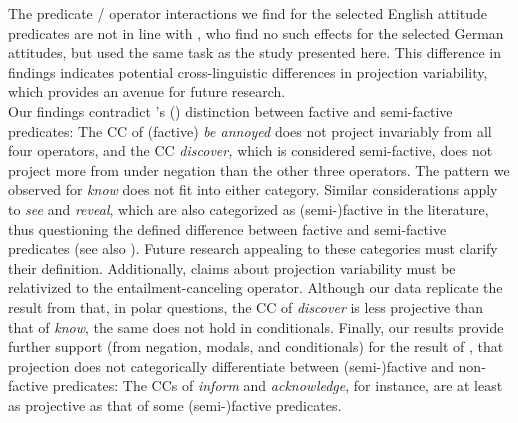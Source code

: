 \documentclass[12pt, a4paper]{article}
\newcommand{\posscite}[1]{\citeauthor{#1}'s (\citeyear{#1})}
\begin{document}
	The predicate / operator interactions we find for the selected English attitude predicates are not in line with \cite{sieker_projective_2022}, who find no such effects for the selected German attitudes, but used the same task as the study presented here. This difference in findings indicates potential cross-linguistic differences in projection variability, which provides an avenue for future research.\\

	Our findings contradict \posscite{karttunen_observations_1971} distinction between factive and semi-factive predicates: The CC of (factive) \emph{be annoyed} does not project invariably from all four operators, and the CC \emph{discover,}  which is considered semi-factive, does not project more from under negation than the other three operators. The pattern we observed for {\em know} does not fit into either category. Similar considerations apply to \emph{see} and \emph{reveal}, which are also categorized as (semi-)factive in the literature, thus questioning the defined difference between factive and semi-factive predicates (see also \citealp{beaver_have_2010}). Future research appealing to these categories must clarify their definition. Additionally, claims about projection variability must be relativized to the entailment-canceling operator. Although our data replicate the result from \citet{tonhauser_how_2018} that, in polar questions, the CC of \emph{discover} is less projective than that of \emph{know}, the same does not hold in conditionals. Finally, our results provide further support (from negation, modals, and conditionals) for the result of \citet{degen_are_2022}, that projection does not categorically differentiate between (semi-)factive and non-factive predicates: The CCs of \emph{inform} and \emph{acknowledge}, for instance, are at least as projective as that of some (semi-)factive predicates.
	
\end{document}
